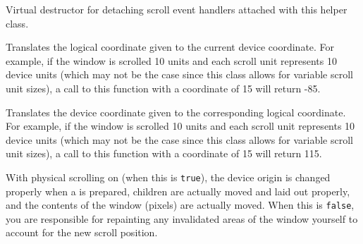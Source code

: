 Virtual destructor for detaching scroll event handlers attached with this
helper class.


\label{wxvarscrollhelperbasecalcscrolledposition}


Translates the logical coordinate given to the current device coordinate.
For example, if the window is scrolled 10 units and each scroll unit
represents 10 device units (which may not be the case since this class allows
for variable scroll unit sizes), a call to this function with a coordinate of
15 will return -85.




\label{wxvarscrollhelperbasecalcunscrolledposition}


Translates the device coordinate given to the corresponding logical
coordinate. For example, if the window is scrolled 10 units and each scroll
unit represents 10 device units (which may not be the case since this class
allows for variable scroll unit sizes), a call to this function with a
coordinate of 15 will return 115.




\label{wxvarscrollhelperbaseenablephysicalscrolling}


With physical scrolling on (when this is {\tt true}), the device origin is
changed properly when a \rtfsp{} is prepared,
children are actually moved and laid out properly, and the contents of the
window (pixels) are actually moved. When this is {\tt false}, you are
responsible for repainting any invalidated areas of the window yourself to
account for the new scroll position.


\label{wxvarscrollhelperbaseestimatetotalsize}


